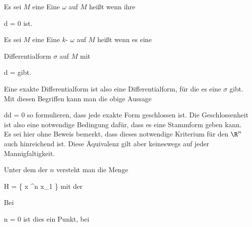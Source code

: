{}
{

Es sei $M$ eine
Eine
$\omega$ auf $M$ heißt  wenn ihre

\mavergleichskette
{\vergleichskette
{ d \omega
}
{ = }{ 0
}
{  }{
}
{    }{
}
{   }{
}
}
{}{}{}
ist.

}

{}
{

Es sei $M$ eine
Eine
$k$-
$\omega$ auf $M$ heißt  wenn es eine

Differentialform $\sigma$ auf $M$ mit

\mavergleichskette
{\vergleichskette
{ d \sigma
}
{ = }{ \omega
}
{  }{
}
{    }{
}
{   }{
}
}
{}{}{}
gibt.

}

Eine exakte Differentialform ist also eine Differentialform, für die es eine  {} $\sigma$ gibt. Mit diesen Begriffen kann man die obige Aussage

\mavergleichskette
{\vergleichskette
{ dd
}
{ = }{ 0
}
{  }{
}
{    }{
}
{   }{
}
}
{}{}{}
so formulieren, dass jede exakte Form geschlossen ist. Die Geschlossenheit ist also eine notwendige Bedingung dafür, dass es eine Stammform geben kann. Es sei hier ohne Beweis bemerkt, dass dieses notwendige Kriterium für den $\R^n$ auch hinreichend ist. Diese Äquivalenz gilt aber keineswegs auf jeder Mannigfaltigkeit.


{}
{

Unter dem  der  $n$ versteht man die Menge

\mavergleichskettedisp
{\vergleichskette
{H
}
{ =} { \left\{  x \in \R^n   \mid   x_1         \right\}
}
{ } {
}
{ } {
}
{ } {
}
}
{}{}{}
mit der

}
Bei

\mavergleichskette
{\vergleichskette
{ n
}
{ = }{ 0
}
{  }{
}
{    }{
}
{   }{
}
}
{}{}{}
ist dies ein Punkt, bei

